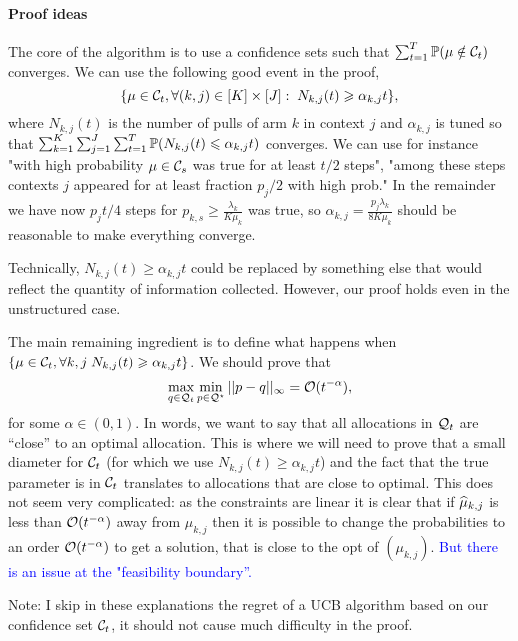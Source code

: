 \paragraph{Proof ideas} The core of the algorithm is to use a confidence sets such that $\sum_{t=1}^T \mathbb{P}(\mu \notin \mathcal{C}_t)$ converges. We can use the following good event in the proof, \[\{\mu \in \mathcal{C}_t, \forall (k,j) \in [K]\times [J]: \; N_{k,j}(t)  \geqslant \alpha_{k,j} t \},\] where $N_{k,j}(t)$ is the number of pulls of arm $k$ in context $j$ and $\alpha_{k, j}$ is tuned so that $\sum_{k=1}^K \sum_{j=1}^J \sum_{t=1}^T \mathbb{P}(N_{k,j}(t)\leqslant \alpha_{k,j}t)$ converges. We can use for instance "with high probability $\mu\in \mathcal{C}_s$ was true for at least $t/2$ steps", "among these steps contexts $j$ appeared for at least fraction $p_j/2$ with high prob." In the remainder we have now $p_jt/4$ steps for $p_{k,s}\geq \frac{\lambda_k}{K\mu_k}$ was true, so  $\alpha_{k,j}= \frac{p_j\lambda_k}{8K\mu_k}$ should be reasonable to make everything converge.

Technically, $N_{k,j}(t)\geq \alpha_{k,j}t$ could be replaced by something else that would reflect the quantity of information collected. However, our proof holds even in the unstructured case.

The main remaining ingredient is to define what happens when $\{\mu \in \mathcal{C}_t, \forall k,j \; N_{k,j}(t)  \geqslant \alpha_{k,j} t\}$. We should prove that 
\[\max_{q \in \mathcal{Q}_t} \min_{p \in \mathcal{Q}^\star} ||p-q ||_\infty = \mathcal{O}(t^{-\alpha}), \]
for some $\alpha \in (0, 1)$. In words, we want to say that all allocations in $\mathcal{Q}_t$ are ``close'' to an optimal allocation. This is where we will need to prove that a small diameter for $\mathcal{C}_t$ (for which we use $N_{k,j}(t)  \geq \alpha_{k,j} t$) and the fact that the true parameter is in $\mathcal{C}_t$ translates to allocations that are close to optimal. This does not seem very complicated: as the constraints are linear it is clear that if $\widehat{\mu}_{k,j}$ is less than $\mathcal{O}(t^{-\alpha})$ away from $\mu_{k, j}$ then it is possible to change the probabilities to an order $\mathcal{O}(t^{-\alpha})$ to get a solution, that is close to the opt of $(\mu_{k,j})$. \textcolor{blue}{But there is an issue at the "feasibility boundary''.}

Note: I skip in these explanations the regret of a UCB algorithm based on our confidence set $\mathcal{C}_t$, it should not cause much difficulty in the proof.



